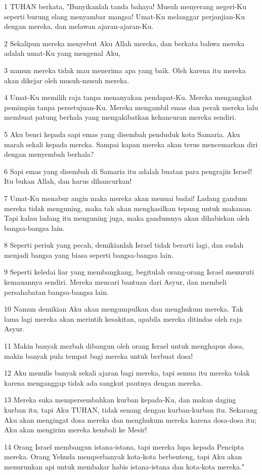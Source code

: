 \par 1 TUHAN berkata, "Bunyikanlah tanda bahaya! Musuh menyerang negeri-Ku seperti burung elang menyambar mangsa! Umat-Ku melanggar perjanjian-Ku dengan mereka, dan melawan ajaran-ajaran-Ku.
\par 2 Sekalipun mereka menyebut Aku Allah mereka, dan berkata bahwa mereka adalah umat-Ku yang mengenal Aku,
\par 3 namun mereka tidak mau menerima apa yang baik. Oleh karena itu mereka akan dikejar oleh musuh-musuh mereka.
\par 4 Umat-Ku memilih raja tanpa menanyakan pendapat-Ku. Mereka mengangkat pemimpin tanpa persetujuan-Ku. Mereka mengambil emas dan perak mereka lalu membuat patung berhala yang mengakibatkan kehancuran mereka sendiri.
\par 5 Aku benci kepada sapi emas yang disembah penduduk kota Samaria. Aku marah sekali kepada mereka. Sampai kapan mereka akan terus mencemarkan diri dengan menyembah berhala?
\par 6 Sapi emas yang disembah di Samaria itu adalah buatan para pengrajin Israel! Itu bukan Allah, dan harus dihancurkan!
\par 7 Umat-Ku menabur angin maka mereka akan menuai badai! Ladang gandum mereka tidak menguning, maka tak akan menghasilkan tepung untuk makanan. Tapi kalau ladang itu menguning juga, maka gandumnya akan dihabiskan oleh bangsa-bangsa lain.
\par 8 Seperti periuk yang pecah, demikianlah Israel tidak berarti lagi, dan sudah menjadi bangsa yang biasa seperti bangsa-bangsa lain.
\par 9 Seperti keledai liar yang membangkang, begitulah orang-orang Israel menuruti kemauannya sendiri. Mereka mencari bantuan dari Asyur, dan membeli persahabatan bangsa-bangsa lain.
\par 10 Namun demikian Aku akan mengumpulkan dan menghukum mereka. Tak lama lagi mereka akan merintih kesakitan, apabila mereka ditindas oleh raja Asyur.
\par 11 Makin banyak mezbah dibangun oleh orang Israel untuk menghapus dosa, makin banyak pula tempat bagi mereka untuk berbuat dosa!
\par 12 Aku menulis banyak sekali ajaran bagi mereka, tapi semua itu mereka tolak karena menganggap tidak ada sangkut pautnya dengan mereka.
\par 13 Mereka suka mempersembahkan kurban kepada-Ku, dan makan daging kurban itu, tapi Aku TUHAN, tidak senang dengan kurban-kurban itu. Sekarang Aku akan mengingat dosa mereka dan menghukum mereka karena dosa-dosa itu; Aku akan mengirim mereka kembali ke Mesir!
\par 14 Orang Israel membangun istana-istana, tapi mereka lupa kepada Pencipta mereka. Orang Yehuda memperbanyak kota-kota berbenteng, tapi Aku akan menurunkan api untuk membakar habis istana-istana dan kota-kota mereka."

